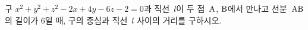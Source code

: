 구 $x^2+y^2+z^2-2x+4y-6z-2=0$과 직선~$l$이 두 점~$\mathrm{A}$, $\mathrm{B}$에서 만나고 선분~$\mathrm{AB}$의 길이가 $6$일 때, 구의 중심과 직선~$l$ 사이의 거리를 구하시오.
